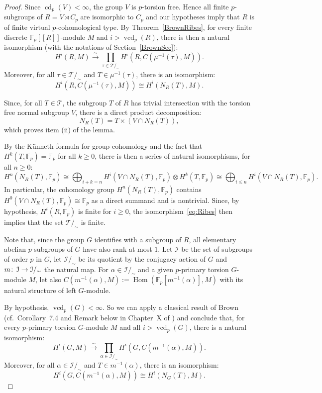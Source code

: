 \documentclass[12pt,twoside]{amsart}
\newcommand\F{{\mathbb F}}
\renewcommand{\hom}{\operatorname{Hom}}
\newcommand\sr{\stackrel}
\newcommand\cT{{\mathcal T}}
\newcommand\cI{{\mathcal I}}
\def\co{\colon\thinspace}
\newcommand\cd{\operatorname{cd}}
\newcommand\vcd{\operatorname{vcd}}
\theoremstyle{definition}
\begin{document}
\begin{proof}Since $\cd_p(V)<\infty$, the group $V$ is $p$-torsion free. Hence all finite $p$-subgroups of $R=V\rtimes C_p$
are isomorphic to $C_p$ and our hypotheses imply that $R$ is of finite virtual $p$-cohomological type. By Theorem~\ref{BrownRibes}, 
for every finite discrete $\F_p[[R]]$-module $M$ and $i>\vcd_p(R)$, there is then a natural isomorphism (with the notations of Section~\ref{BrownSec}):
\begin{equation}\label{eq:Ribes}
H^i(R, M)\sr{\sim}{\to}\prod_{\tau\in\cT/_\sim}H^i(R,C(\mu^{-1}(\tau),M)).
\end{equation}
Moreover, for all $\tau\in\cT/_\sim$ and $T\in\mu^{-1}(\tau)$, there is an isomorphism: 
\begin{equation}\label{eq:Ribes2}
H^i(R,C(\mu^{-1}(\tau),M))\cong H^i(N_R(T),M).
\end{equation}

Since, for all $T\in\cT$, the subgroup $T$ of $R$ has trivial intersection with the torsion free normal subgroup $V$, 
there is a direct product decomposition: 
\[N_R(T)=T\times(V\cap N_R(T)),\]
which proves item (ii) of the lemma. 

By the K\"unneth formula for group cohomology and the fact that $H^k(T,\F_p)=\F_p$ for all $k\geq 0$,
there is then a series of natural isomorphisms, for all $n\geq 0$:
\begin{equation}\label{Kunneth1}
H^n(N_R(T),\F_p)\cong\bigoplus_{i+k=n} H^i(V\cap N_R(T),\F_p)\otimes H^k(T,\F_p)\cong\bigoplus_{i\leq n} H^i(V\cap N_R(T),\F_p).
\end{equation}
In particular, the cohomology group $H^n(N_R(T),\F_p)$ contains $H^0(V\cap N_R(T),\F_p)\cong\F_p$ as a direct summand and is nontrivial.
Since, by hypothesis, $H^i(R, \F_p)$ is finite for $i\geq 0$, the isomorphism~\eqref{eq:Ribes} then implies that the set $\cT/_\sim$ is finite.

Note that, since the group $G$ identifies with a subgroup of $R$, all elementary abelian $p$-subgroups of $G$ have also rank at most $1$.
Let $\cI$ be the set of subgroups of order $p$ in $G$, let $\cI/_\sim$ be its quotient by the conjugacy action of $G$ and $m\co\cI\to\cI/_\sim$ the natural map.  
For $\alpha\in \cI/_\sim$ and a given $p$-primary torsion $G$-module $M$, let also $C(m^{-1}(\alpha),M):=\hom(\F_p[m^{-1}(\alpha)],M)$ with its natural
structure of left $G$-module.

By hypothesis, $\vcd_p(G)<\infty$. So we can apply a classical result of Brown (cf.\ Corollary~7.4 and Remark below in Chapter~X of \cite{Brown}) 
and conclude that, for every $p$-primary torsion $G$-module $M$ and all $i>\vcd_p(G)$, there is a natural isomorphism:
\begin{equation}\label{eq:Brown} 
H^i(G,M)\sr{\sim}{\to} \prod_{\alpha\in \cI/_\sim} H^i(G,C(m^{-1}(\alpha),M)).
\end{equation}
Moreover, for all $\alpha\in \cI/_\sim$ and $T\in m^{-1}(\alpha)$, there is an isomorphism: 
\begin{equation}\label{eq:Brown2}
H^i(G,C(m^{-1}(\alpha),M))\cong H^i(N_G(T),M).
\end{equation}


\end{proof}
\end{document}
